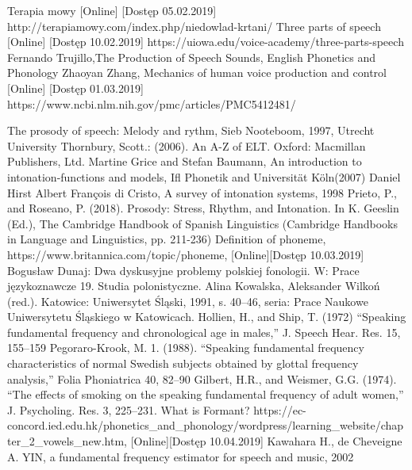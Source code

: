 \documentclass[a4paper,12 pt]{article}
\begin{document}
\begin{thebibliography}{99}
Terapia mowy [Online] [Dostęp 05.02.2019]
http://terapiamowy.com/index.php/niedowlad-krtani/
Three parts of speech [Online] [Dostęp 10.02.2019]
https://uiowa.edu/voice-academy/three-parts-speech
 Fernando Trujillo,The Production of Speech Sounds, English Phonetics and Phonology
Zhaoyan Zhang, Mechanics of human voice production and control [Online] [Dostęp 01.03.2019]
https://www.ncbi.nlm.nih.gov/pmc/articles/PMC5412481/

The prosody of speech: Melody and rythm, Sieb Nooteboom, 1997, Utrecht University
Thornbury, Scott.:
 (2006). An A-Z of ELT. Oxford: Macmillan Publishers, Ltd.
Martine Grice and Stefan Baumann, An introduction to intonation-functions and models, Ifl Phonetik and Universität Köln(2007)
Daniel Hirst Albert François di Cristo, A survey of intonation systems, 1998
Prieto, P., and Roseano, P. (2018). Prosody: Stress, Rhythm, and Intonation. In K. Geeslin (Ed.), The Cambridge Handbook of Spanish Linguistics (Cambridge Handbooks in Language and Linguistics, pp. 211-236)
Definition of phoneme, https://www.britannica.com/topic/phoneme, [Online][Dostęp 10.03.2019]
Bogusław Dunaj: Dwa dyskusyjne problemy polskiej fonologii. W: Prace językoznawcze 19. Studia polonistyczne. Alina Kowalska, Aleksander Wilkoń (red.). Katowice: Uniwersytet Śląski, 1991, s. 40–46, seria: Prace Naukowe Uniwersytetu Śląskiego w Katowicach.
Hollien, H., and Ship, T. (1972) “Speaking fundamental frequency and chronological age in males,” J. Speech Hear. Res. 15, 155–159
Pegoraro-Krook, M. 1. (1988). “Speaking fundamental frequency characteristics of normal Swedish subjects obtained by glottal frequency analysis,” Folia Phoniatrica 40, 82–90
Gilbert, H.R., and Weismer, G.G. (1974). “The effects of smoking on the speaking fundamental frequency of adult women,” J. Psycholing. Res. 3, 225–231. 
What is Formant? https://ec-concord.ied.edu.hk/phonetics\_and\_phonology/wordpress/learning\_website/chapter\_2\_vowels\_new.htm, [Online][Dostęp 10.04.2019]
Kawahara H., de Cheveigne A. YIN, a fundamental frequency estimator for speech and music, 2002

\end{thebibliography}
\end{document}
